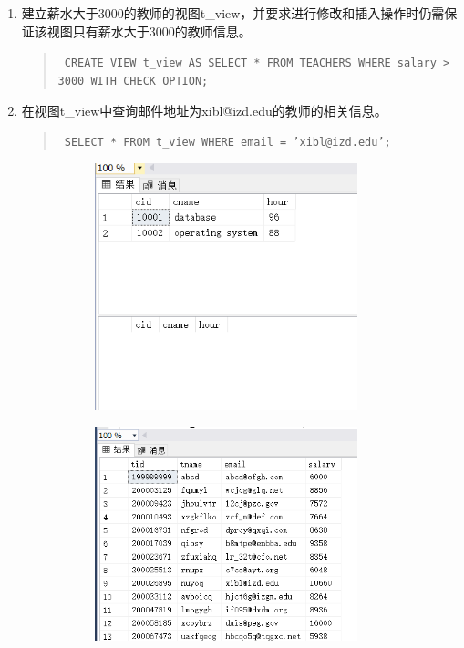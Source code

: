\documentclass[a4paper,twoside]{article}
\begin{document}
\begin{spacing}{1.2}
\begin{enumerate}
\item	建立薪水大于3000的教师的视图t\_view，并要求进行修改和插入操作时仍需保证该视图只有薪水大于3000的教师信息。
\begin{quote}
  \texttt{
    CREATE VIEW t\_view
AS
    SELECT *
    FROM TEACHERS
    WHERE salary > 3000
    WITH CHECK OPTION;\\
  }
\end{quote}
\item	在视图t\_view中查询邮件地址为xibl@izd.edu的教师的相关信息。
\begin{quote}
  \texttt{
    SELECT *
FROM t\_view
WHERE email = 'xibl@izd.edu';\\
  }
\end{quote}

\begin{figure}[htb]
  \centering
  \begin{subfigure}{0.4\textwidth}
    \centering
    \includegraphics[width=0.9\textwidth]{9.png}
  \end{subfigure}
  \begin{subfigure}{0.4\textwidth}
    \centering
    \includegraphics[width=0.9\textwidth]{10.png}

\end{subfigure}
\end{figure}
\end{enumerate}
\end{spacing}
\end{document}
